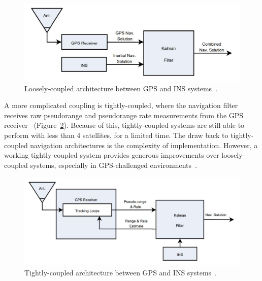 \begin{figure}[!ht]
    \centering
    \includegraphics[width=\linewidth]{Figures/LC.jpg}
    \caption{Loosely-coupled architecture between GPS and INS systems~\cite{hammAnalysisSimulatedPerformance2005}.}\label{fig:LC}
\end{figure}

A more complicated coupling is {tightly-coupled}, where the navigation filter receives raw pseudorange and pseudorange rate measurements from the GPS receiver~\cite{kaplanUnderstandingGPSPrinciples2006} (Figure~\ref{fig:TC}). Because of this, tightly-coupled systems are still able to perform with less than 4 satellites, for a limited time. The draw back to tightly-coupled navigation architectures is the complexity of implementation. However, a working tightly-coupled system provides generous improvements over loosely-coupled systems, especially in GPS-challenged environments~\cite{grierPositionNavigationTiming}.

\begin{figure}[!ht]
    \centering
    \includegraphics[width=\linewidth]{Figures/TC.jpg}
    \caption{Tightly-coupled architecture between GPS and INS systems~\cite{hammAnalysisSimulatedPerformance2005}.}\label{fig:TC}
\end{figure}

